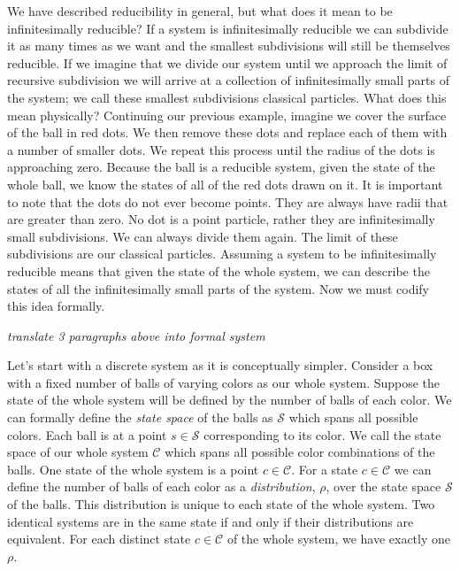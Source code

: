 \documentclass{article}
\begin{document}
	 We have described reducibility in general, but what does it mean to be infinitesimally reducible? If a system is infinitesimally reducible we can subdivide it as many times as we want and the smallest subdivisions will still be themselves reducible. If we imagine that we divide our system until we approach the limit of recursive subdivision we will arrive at a collection of infinitesimally small parts of the system; we call these smallest subdivisions classical particles. What does this mean physically? Continuing our previous example, imagine we cover the surface of the ball in red dots. We then remove these dots and replace each of them with a number of smaller dots. We repeat this process until the radius of the dots is approaching zero. Because the ball is a reducible system, given the state of the whole ball, we know the states of all of the red dots drawn on it. It is important to note that the dots do not ever become points. They are always have radii that are greater than zero. No dot is a point particle, rather they are infinitesimally small subdivisions. We can always divide them again. The limit of these subdivisions are our classical particles. Assuming a system to be infinitesimally reducible means that given the state of the whole system, we can describe the states of all the infinitesimally small parts of the system. Now we must codify this idea formally.
	 
	 \emph{translate 3 paragraphs above into formal system}
	
	Let's start with a discrete system as it is conceptually simpler. Consider a box with a fixed number of balls of varying colors as our whole system. Suppose the state of the whole system will be defined by the number of balls of each color. We can formally define the \textit{state space} of the balls as $\mathcal{S}$ which spans all possible colors. Each ball is at a point $s \in \mathcal{S}$ corresponding to its color. We call the state space of our whole system $\mathcal{C}$ which spans all possible color combinations of the balls. One state of the whole system is a point $c \in \mathcal{C}$. For a state $c \in \mathcal{C}$ we can define the number of balls of each color as a \textit{distribution}, $\rho$, over the state space $\mathcal{S}$ of the balls. This distribution is unique to each state of the whole system. Two identical systems are in the same state if and only if their distributions are equivalent. For each distinct state $c \in \mathcal{C}$ of the whole system, we have exactly one $\rho$. 
\end{document}
